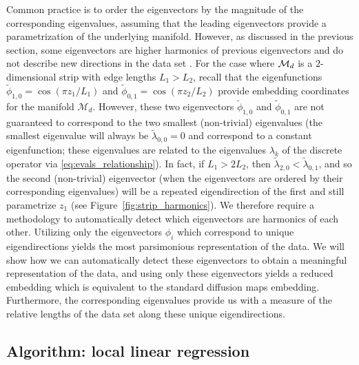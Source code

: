 Common practice is to order the eigenvectors by the magnitude of the corresponding eigenvalues, assuming that the leading eigenvectors provide a parametrization of the underlying manifold.
%
However, as discussed in the previous section, some eigenvectors are higher harmonics of previous eigenvectors and do not describe new directions in the data set \cite{gerber2007robust}.
%
For the case where $\mathcal{M}_d$ is a $2$-dimensional strip with edge lengths $L_1  > L_2$, recall that the eigenfunctions $\tilde{\phi}_{1,0} = \cos \left(  {\pi z_1}/{L_1} \right)$ and  $\tilde{\phi}_{0,1} = \cos \left(  {\pi z_2}/{L_2} \right)$ provide embedding coordinates for the manifold $\mathcal{M}_d$.
%
However, these two eigenvectors $\tilde{\phi}_{1, 0}$ and $\tilde{\phi}_{0, 1}$ are not guaranteed to correspond to the two smallest (non-trivial) eigenvalues (the smallest eigenvalue will always be $\tilde{\lambda}_{0,0} = 0$ and correspond to a constant eigenfunction; these eigenvalues are related to the eigenvalues $\lambda_k$ of the discrete operator via \eqref{eq:evals_relationship}).
%
In fact, if $L_1 > 2 L_2$, then $\tilde{\lambda}_{2, 0} < \tilde{\lambda}_{0, 1}$, and so the second (non-trivial) eigenvector (when the eigenvectors are ordered by their corresponding eigenvalues) will be a repeated eigendirection of the first and still parametrize $z_1$ (see Figure~\ref{fig:strip_harmonics}).
%
We therefore require a methodology to automatically detect which eigenvectors are harmonics of each other.
%
Utilizing only the eigenvectors $\phi_i$ which correspond to unique eigendirections yields the most parsimonious representation of the data.
%
We will show how we can automatically detect these eigenvectors to obtain a meaningful representation of the data, and using only these eigenvectors yields a reduced embedding which is equivalent to the standard diffusion maps embedding.
%
Furthermore, the corresponding eigenvalues provide us with a measure of the relative lengths of the data set along these unique eigendirections.


\subsection{Algorithm: local linear regression}

